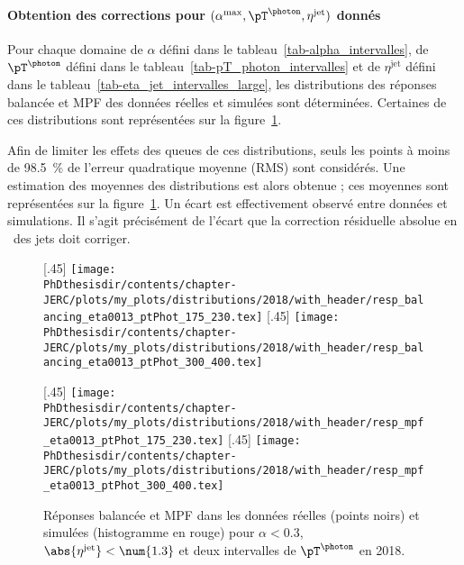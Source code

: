 \paragraph{Obtention des corrections pour $(\alpha^\text{max}, \pT^{\photon}, \eta^\text{jet})$ donnés}
Pour chaque domaine
de $\alpha$ défini dans le tableau~\ref{tab-alpha_intervalles},
de $\pT^{\photon}$ défini dans le tableau~\ref{tab-pT_photon_intervalles} et
de $\eta^\text{jet}$ défini dans le tableau~\ref{tab-eta_jet_intervalles_large},
les distributions des réponses balancée et MPF des données réelles et simulées sont déterminées.
Certaines de ces distributions sont représentées sur la figure~\ref{fig-distribs_Gjets_17UL_resp_bal_and_mpf}.
\par Afin de limiter les effets des queues de ces distributions, seuls les points à moins de \SI{98.5}{\%} de l'erreur quadratique moyenne (RMS) sont considérés.
Une estimation des moyennes des distributions est alors obtenue ; ces moyennes sont représentées sur la figure~\ref{fig-distribs_Gjets_17UL_resp_bal_and_mpf}.
Un écart est effectivement observé entre données et simulations.
Il s'agit précisément de l'écart que la correction résiduelle absolue en \pT\ des jets doit corriger.
\begin{figure}[h]
\centering
\subcaptionbox{Réponse balancée pour $\pT^{\photon}\in[175, 230[$ \SI{}{\GeV}.\label{subfig-distrib_Gjets_18_resp_balancing_eta0013_ptPhot_175_230}}[.45\textwidth]
{\texttt{[image: \\PhDthesisdir/contents/chapter-JERC/plots/my\_plots/distributions/2018/with\_header/resp\_balancing\_eta0013\_ptPhot\_175\_230.tex]}}
\hfill
\subcaptionbox{Réponse balancée pour $\pT^{\photon}\in[300, 400[$ \SI{}{\GeV}.\label{subfig-distrib_Gjets_18_resp_balancing_eta0013_ptPhot_300_400}}[.45\textwidth]
{\texttt{[image: \\PhDthesisdir/contents/chapter-JERC/plots/my\_plots/distributions/2018/with\_header/resp\_balancing\_eta0013\_ptPhot\_300\_400.tex]}}

\vspace{.5\baselineskip}

\subcaptionbox{Réponse MPF pour $\pT^{\photon}\in[175, 230[$ \SI{}{\GeV}.\label{subfig-distrib_Gjets_18_resp_mpf_eta0013_ptPhot_175_230}}[.45\textwidth]
{\texttt{[image: \\PhDthesisdir/contents/chapter-JERC/plots/my\_plots/distributions/2018/with\_header/resp\_mpf\_eta0013\_ptPhot\_175\_230.tex]}}
\hfill
\subcaptionbox{Réponse MPF pour $\pT^{\photon}\in[300, 400[$ \SI{}{\GeV}.\label{subfig-distrib_Gjets_18_resp_mpf_eta0013_ptPhot_300_400}}[.45\textwidth]
{\texttt{[image: \\PhDthesisdir/contents/chapter-JERC/plots/my\_plots/distributions/2018/with\_header/resp\_mpf\_eta0013\_ptPhot\_300\_400.tex]}}

\caption[Réponses balancée et MPF en 2018.]{Réponses balancée et MPF dans les données réelles (points noirs) et simulées (histogramme en rouge) pour $\alpha<\num{0.3}$, $\abs{\eta^\text{jet}}<\num{1.3}$ et deux intervalles de $\pT^{\photon}$ en 2018.}
\label{fig-distribs_Gjets_17UL_resp_bal_and_mpf}
\end{figure}

